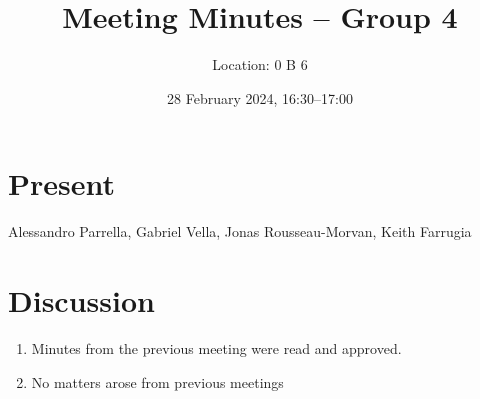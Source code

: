 \documentclass{cce2014-meetings}
\title{Meeting Minutes -- Group 4}
\author{Location: 0 B 6}
\date{28 February 2024, 16:30--17:00}
\begin{document}
\maketitle

\section*{Present}
Alessandro Parrella,
Gabriel Vella,
Jonas Rousseau-Morvan,
Keith Farrugia

\section*{Discussion}

\begin{enumerate}


      \item Minutes from the previous meeting were read and approved.

      \item No matters arose from previous meetings


\end{enumerate}
\end{document}
